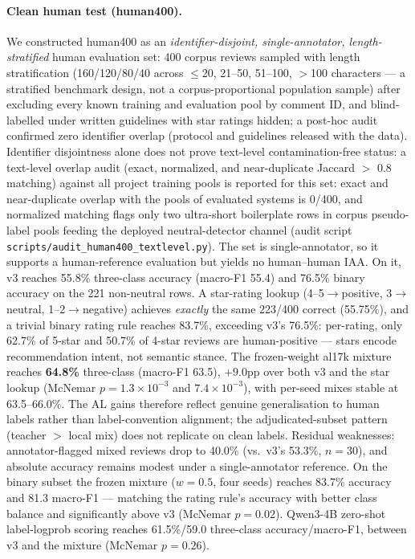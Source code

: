 \documentclass[11pt,a4paper]{article}
\newcommand{\code}[1]{\texttt{#1}}
\begin{document}
\paragraph{Clean human test (human400).}
\label{sec:human400}
We constructed human400 as an \emph{identifier-disjoint,
single-annotator, length-stratified} human evaluation set: 400 corpus
reviews sampled with length stratification (160/120/80/40 across $\le$20,
21--50, 51--100, $>$100 characters --- a stratified benchmark design,
not a corpus-proportional population sample) after excluding every known
training and evaluation pool by comment ID, and blind-labelled under
written guidelines with star ratings hidden; a post-hoc audit
confirmed zero identifier overlap (protocol and guidelines released
with the data). Identifier disjointness alone does not prove
text-level contamination-free status: a text-level overlap audit
(exact, normalized, and near-duplicate Jaccard $>$ 0.8 matching)
against all project training pools is reported for this set:
exact and near-duplicate overlap with the pools of evaluated systems
is 0/400, and normalized matching flags only two ultra-short
boilerplate rows in corpus pseudo-label pools feeding the deployed
neutral-detector channel (audit script
\code{scripts/audit\_human400\_textlevel.py}). The set is single-annotator, so it
supports a human-reference evaluation but yields no human--human IAA.
On it, v3 reaches 55.8\% three-class accuracy (macro-F1 55.4) and
76.5\% binary accuracy on the 221 non-neutral rows. A star-rating
lookup (4--5$\to$positive, 3$\to$neutral, 1--2$\to$negative)
achieves \emph{exactly} the same 223/400 correct (55.75\%), and a
trivial binary rating rule reaches 83.7\%, exceeding v3's 76.5\%:
per-rating, only 62.7\% of 5-star and 50.7\% of 4-star reviews are
human-positive --- stars encode recommendation intent, not semantic
stance. The frozen-weight al17k mixture reaches \textbf{64.8\%}
three-class (macro-F1 63.5), $+9.0$pp over both v3 and the star
lookup (McNemar $p{=}1.3{\times}10^{-3}$ and $7.4{\times}10^{-3}$),
with per-seed mixes stable at 63.5--66.0\%. The AL gains therefore
reflect genuine generalisation to human labels rather than
label-convention alignment; the adjudicated-subset pattern
(teacher $>$ local mix) does not replicate on clean labels. Residual
weaknesses: annotator-flagged mixed reviews drop to 40.0\% (vs.\
v3's 53.3\%, $n{=}30$), and absolute accuracy remains modest under a
single-annotator reference. On the binary subset the frozen mixture
($w{=}0.5$, four seeds) reaches 83.7\% accuracy and 81.3 macro-F1 ---
matching the rating rule's accuracy with better class balance and
significantly above v3 (McNemar $p{=}0.02$). Qwen3-4B zero-shot
label-logprob scoring reaches 61.5\%/59.0 three-class
accuracy/macro-F1, between v3 and the mixture (McNemar
$p{=}0.26$).
\end{document}
